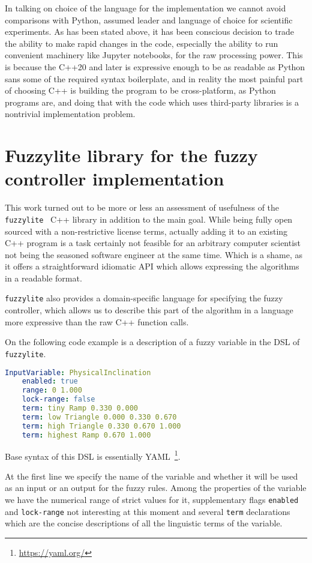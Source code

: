 \documentclass[12pt, a4paper]{report}
\begin{document}
	In talking on choice of the language for the implementation we cannot avoid comparisons with Python, assumed leader and language of choice for scientific experiments.
	As has been stated above, it has been conscious decision to trade the ability to make rapid changes in the code, especially the ability to run convenient machinery like Jupyter notebooks, for the raw processing power.
	This is because the C++20 and later is expressive enough to be as readable as Python sans some of the required syntax boilerplate, and in reality the most painful part of choosing C++ is building the program to be cross-platform, as Python programs are, and doing that with the code which uses third-party libraries is a nontrivial implementation problem.

	\section{Fuzzylite library for the fuzzy controller implementation}\label{fuzzy-implementation}

	This work turned out to be more or less an assessment of usefulness of the \texttt{fuzzylite}~\cite{fl::fuzzylite} C++ library in addition to the main goal.
	While being fully open sourced with a non-restrictive license terms, actually adding it to an existing C++ program is a task certainly not feasible for an arbitrary computer scientist not being the seasoned software engineer at the same time.
	Which is a shame, as it offers a straightforward idiomatic API which allows expressing the algorithms in a readable format.

	\texttt{fuzzylite} also provides a domain-specific language for specifying the fuzzy controller, which allows us to describe this part of the algorithm in a language more expressive than the raw C++ function calls.

  On the following code example is a description of a fuzzy variable in the DSL of \texttt{fuzzylite}.

  \begin{lstlisting}[language=yaml]
  InputVariable: PhysicalInclination
    enabled: true
    range: 0 1.000
    lock-range: false
    term: tiny Ramp 0.330 0.000
    term: low Triangle 0.000 0.330 0.670
    term: high Triangle 0.330 0.670 1.000
    term: highest Ramp 0.670 1.000
  \end{lstlisting}

  Base syntax of this DSL is essentially YAML~\footnote{\url{https://yaml.org/}}.

  At the first line we specify the name of the variable and whether it will be used as an input or an output for the fuzzy rules.
  Among the properties of the variable we have the numerical range of strict values for it, supplementary flags \texttt{enabled} and \texttt{lock-range} not interesting at this moment
  and several \texttt{term} declarations which are the concise descriptions of all the linguistic terms of the variable.
\end{document}
